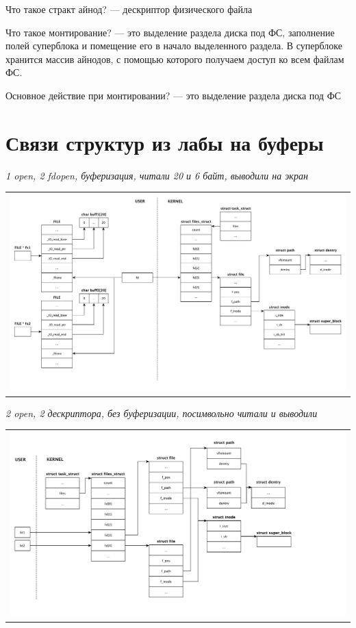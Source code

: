 Что такое стракт айнод? --- дескриптор физического файла

Что такое монтирование? --- это выделение раздела диска под ФС, заполнение полей суперблока и помещение его в начало выделенного раздела. В суперблоке хранится массив айнодов, с помощью которого получаем доступ ко всем файлам ФС.

Основное действие при монтировании? --- это выделение раздела диска под ФС

\section*{Связи структур из лабы на буферы}

\textit{1 open, 2 fdopen, буферизация, читали 20 и 6 байт, выводили на экран}
\begin{table}[H]
  \centering
  \begin{tabular}{p{1\linewidth}}
    \centering
    \includegraphics[width=0.8\linewidth]{./images/scheme1.pdf}
  \end{tabular}
\end{table}

\textit{2 open, 2 дескриптора, без буферизации, посимвольно читали и выводили}
\begin{table}[H]
  \centering
  \begin{tabular}{p{1\linewidth}}
    \centering
    \includegraphics[width=0.8\linewidth]{./images/scheme2.pdf}
  \end{tabular}
\end{table}

